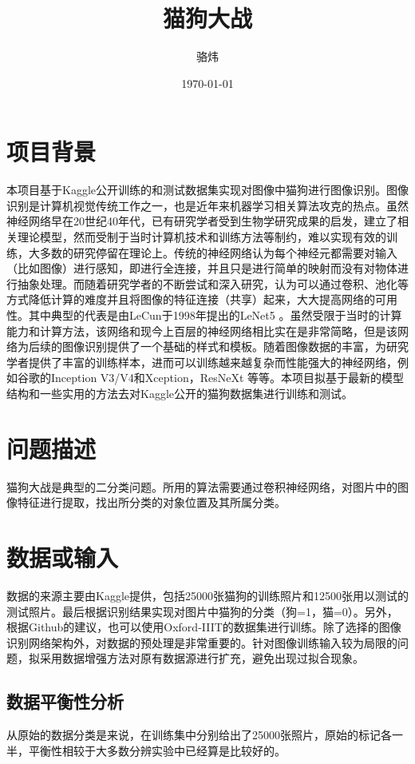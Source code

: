 \documentclass[a4paper,11pt]{article}
\author{骆炜}
\date{\today}
\title{猫狗大战}
\begin{document}
\maketitle
\tableofcontents


\section{项目背景}
\label{sec:org7dc784c}
本项目基于Kaggle公开训练的和测试数据集实现对图像中猫狗进行图像识别。图像识别是计算机视觉传统工作之一，也是近年来机器学习相关算法攻克的热点。虽然神经网络早在20世纪40年代，已有研究学者受到生物学研究成果的启发，建立了相关理论模型，然而受制于当时计算机技术和训练方法等制约，难以实现有效的训练，大多数的研究停留在理论上。传统的神经网络认为每个神经元都需要对输入（比如图像）进行感知，即进行全连接，并且只是进行简单的映射而没有对物体进行抽象处理。而随着研究学者的不断尝试和深入研究，认为可以通过卷积、池化等方式降低计算的难度并且将图像的特征连接（共享）起来，大大提高网络的可用性。其中典型的代表是由LeCun于1998年提出的LeNet5 \cite{KrizhevskySutskeverHinton2017} 。虽然受限于当时的计算能力和计算方法，该网络和现今上百层的神经网络相比实在是非常简略，但是该网络为后续的图像识别提供了一个基础的样式和模板。随着图像数据的丰富，为研究学者提供了丰富的训练样本，进而可以训练越来越复杂而性能强大的神经网络，例如谷歌的Inception V3/V4和Xception，ResNeXt \cite{XieGirshickDollarTuHe2017} 等等。本项目拟基于最新的模型结构和一些实用的方法去对Kaggle公开的猫狗数据集进行训练和测试。
\section{问题描述}
\label{sec:org5b1e0f4}
猫狗大战是典型的二分类问题。所用的算法需要通过卷积神经网络，对图片中的图像特征进行提取，找出所分类的对象位置及其所属分类。
\section{数据或输入}
\label{sec:org029b502}
数据的来源主要由Kaggle提供，包括25000张猫狗的训练照片和12500张用以测试的测试照片。最后根据识别结果实现对图片中猫狗的分类（狗=1，猫=0）。另外，根据Github的建议，也可以使用Oxford-IIIT的数据集进行训练。除了选择的图像识别网络架构外，对数据的预处理是非常重要的。针对图像训练输入较为局限的问题，拟采用数据增强方法对原有数据源进行扩充，避免出现过拟合现象。

\subsection{数据平衡性分析}
\label{sec:org20914cf}
从原始的数据分类是来说，在训练集中分别给出了25000张照片，原始的标记各一半，平衡性相较于大多数分辨实验中已经算是比较好的。
\end{document}

